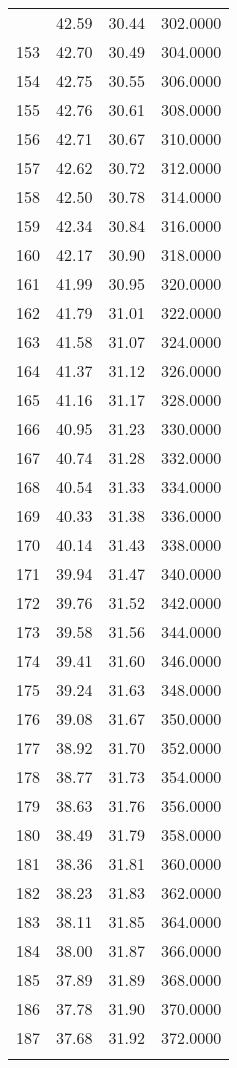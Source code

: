 \documentclass[
  captions=tableheading,
]{scrartcl}
\begin{document}
\begin{longtable} {l|l|l|l}
{152 &	42.59 &	30.44 &	302.0000\\
153 &	42.70 &	30.49 &	304.0000\\
154 &	42.75 &	30.55 &	306.0000\\
155 &	42.76 &	30.61 &	308.0000\\
156 &	42.71 &	30.67 &	310.0000\\
157 &	42.62 &	30.72 &	312.0000\\
158 &	42.50 &	30.78 &	314.0000\\
159 &	42.34 &	30.84 &	316.0000\\
160 &	42.17 &	30.90 &	318.0000\\
161 &	41.99 &	30.95 &	320.0000\\
162 &	41.79 &	31.01 &	322.0000\\
163 &	41.58 &	31.07 &	324.0000\\
164 &	41.37 &	31.12 &	326.0000\\
165 &	41.16 &	31.17 &	328.0000\\
166 &	40.95 &	31.23 &	330.0000\\
167 &	40.74 &	31.28 &	332.0000\\
168 &	40.54 &	31.33 &	334.0000\\
169 &	40.33 &	31.38 &	336.0000\\
170 &	40.14 &	31.43 &	338.0000\\
171 &	39.94 &	31.47 &	340.0000\\
172 &	39.76 &	31.52 &	342.0000\\
173 &	39.58 &	31.56 &	344.0000\\
174 &	39.41 &	31.60 &	346.0000\\
175 &	39.24 &	31.63 &	348.0000\\
176 &	39.08 &	31.67 &	350.0000\\
177 &	38.92 &	31.70 &	352.0000\\
178 &	38.77 &	31.73 &	354.0000\\
179 &	38.63 &	31.76 &	356.0000\\
180 &	38.49 &	31.79 &	358.0000\\
181 &	38.36 &	31.81 &	360.0000\\
182 &	38.23 &	31.83 &	362.0000\\
183 &	38.11 &	31.85 &	364.0000\\
184 &	38.00 &	31.87 &	366.0000\\
185 &	37.89 &	31.89 &	368.0000\\
186 &	37.78 &	31.90 &	370.0000\\
187 &	37.68 &	31.92 &	372.0000\\
}
\end{longtable}
\end{document}
